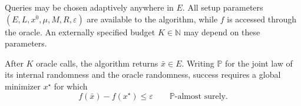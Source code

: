 \documentclass[10pt]{article}
\theoremstyle{definition}
\begin{document}
Queries may be chosen adaptively anywhere in $E$. All setup parameters $(E,L,x^0,\mu,M,R,\varepsilon)$ are available to the algorithm, while $f$ is accessed through the oracle. An externally specified budget $K\in\mathbb{N}$ may depend on these parameters.

After $K$ oracle calls, the algorithm returns $\bar{x}\in E$. Writing $\mathbb{P}$ for the joint law of its internal randomness and the oracle randomness, success requires a global minimizer $x^\star$ for which
\begin{equation*}
f(\bar{x})-f(x^\star)\leq\varepsilon
\qquad \mathbb{P}\text{-almost surely}.
\end{equation*}
\end{document}
